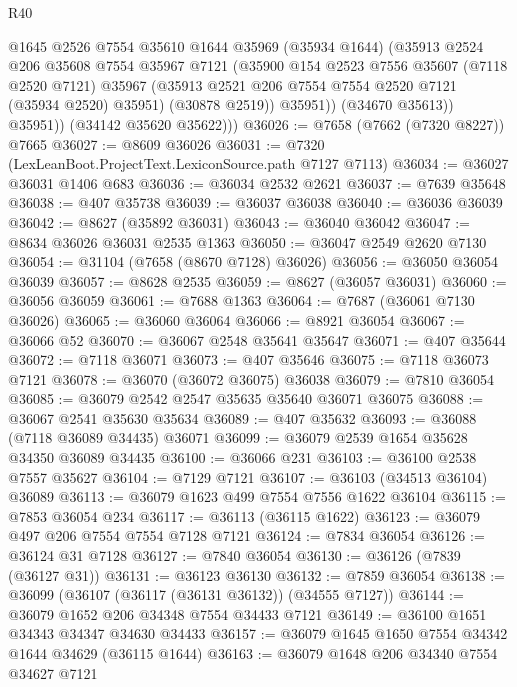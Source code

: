 \begin{lexlean}{R40}
\begin{coremodule}
                @1645
                @2526
                @7554
                @35610
                @1644
                @35969
                (@35934 @1644)
                (@35913
                  @2524
                  @206
                  @35608
                  @7554
                  @35967
                  @7121
                  (@35900
                    @154
                    @2523
                    @7556
                    @35607
                    (@7118 @2520 @7121)
                    @35967
                    (@35913 @2521 @206 @7554 @7554 @2520 @7121 (@35934 @2520) @35951)
                    (@30878 @2519))
                  @35951))
              (@34670 @35613))
            @35951))
        (@34142 @35620 @35622)))
@36026 := @7658 (@7662 (@7320 @8227)) @7665
@36027 := @8609 @36026
@36031 := @7320 (LexLeanBoot.ProjectText.LexiconSource.path @7127 @7113)
@36034 := @36027 @36031 @1406 @683
@36036 := @36034 @2532 @2621
@36037 := @7639 @35648
@36038 := @407 @35738
@36039 := @36037 @36038
@36040 := @36036 @36039
@36042 := @8627 (@35892 @36031)
@36043 := @36040 @36042
@36047 := @8634 @36026 @36031 @2535 @1363
@36050 := @36047 @2549 @2620 @7130
@36054 := @31104 (@7658 (@8670 @7128) @36026)
@36056 := @36050 @36054 @36039
@36057 := @8628 @2535
@36059 := @8627 (@36057 @36031)
@36060 := @36056 @36059
@36061 := @7688 @1363
@36064 := @7687 (@36061 @7130 @36026)
@36065 := @36060 @36064
@36066 := @8921 @36054
@36067 := @36066 @52
@36070 := @36067 @2548 @35641 @35647
@36071 := @407 @35644
@36072 := @7118 @36071
@36073 := @407 @35646
@36075 := @7118 @36073 @7121
@36078 := @36070 (@36072 @36075) @36038
@36079 := @7810 @36054
@36085 := @36079 @2542 @2547 @35635 @35640 @36071 @36075
@36088 := @36067 @2541 @35630 @35634
@36089 := @407 @35632
@36093 := @36088 (@7118 @36089 @34435) @36071
@36099 := @36079 @2539 @1654 @35628 @34350 @36089 @34435
@36100 := @36066 @231
@36103 := @36100 @2538 @7557 @35627
@36104 := @7129 @7121
@36107 := @36103 (@34513 @36104) @36089
@36113 := @36079 @1623 @499 @7554 @7556 @1622 @36104
@36115 := @7853 @36054 @234
@36117 := @36113 (@36115 @1622)
@36123 := @36079 @497 @206 @7554 @7554 @7128 @7121
@36124 := @7834 @36054
@36126 := @36124 @31 @7128
@36127 := @7840 @36054
@36130 := @36126 (@7839 (@36127 @31))
@36131 := @36123 @36130
@36132 := @7859 @36054
@36138 := @36099 (@36107 (@36117 (@36131 @36132)) (@34555 @7127))
@36144 := @36079 @1652 @206 @34348 @7554 @34433 @7121
@36149 := @36100 @1651 @34343 @34347 @34630 @34433
@36157 := @36079 @1645 @1650 @7554 @34342 @1644 @34629 (@36115 @1644)
@36163 := @36079 @1648 @206 @34340 @7554 @34627 @7121

\end{coremodule}
\end{lexlean}
